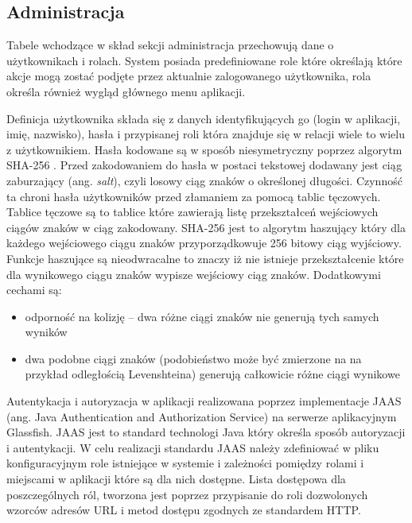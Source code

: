  
  
\subsection{Administracja}  


Tabele wchodzące w skład sekcji administracja przechowują dane o użytkownikach i rolach. System posiada predefiniowane role które określają które akcje mogą zostać podjęte przez aktualnie zalogowanego użytkownika, rola określa również wygląd głównego menu aplikacji.

Definicja użytkownika składa się z danych identyfikujących go (login w aplikacji, imię, nazwisko), hasła i przypisanej roli która znajduje się w relacji wiele to wielu z użytkownikiem. Hasła kodowane są w sposób niesymetryczny poprzez algorytm SHA-256 \cite{sha2}. Przed zakodowaniem do hasła w postaci tekstowej dodawany jest ciąg zaburzający (ang. \textit{salt}), czyli losowy ciąg znaków o określonej długości. Czynność ta chroni hasła użytkowników przed złamaniem za pomocą tablic tęczowych. Tablice tęczowe są to tablice które zawierają listę przekształceń wejściowych ciągów znaków w ciąg zakodowany. SHA-256 jest to algorytm haszujący \cite{hash} który dla każdego wejściowego ciągu znaków przyporządkowuje 256 bitowy ciąg wyjściowy. Funkcje haszujące są nieodwracalne to znaczy iż nie istnieje przekształcenie które dla wynikowego ciągu znaków wypisze wejściowy ciąg znaków. Dodatkowymi cechami są:
\begin{itemize}
  \item  odporność na kolizję --  dwa różne ciągi znaków nie generują tych samych wyników 
  \item dwa podobne ciągi znaków (podobieństwo może być zmierzone na na przykład odległością Levenshteina\cite{Levenshtein}) generują całkowicie różne ciągi wynikowe
\end{itemize}

Autentykacja i autoryzacja w aplikacji realizowana poprzez implementacje JAAS\cite{jaas} (ang. Java Authentication and Authorization Service) na serwerze aplikacyjnym Glassfish. JAAS jest to standard technologi Java który określa sposób autoryzacji i autentykacji. W celu realizacji standardu JAAS należy zdefiniować w pliku konfiguracyjnym role istniejące w systemie i zależności pomiędzy rolami i miejscami w aplikacji które są dla nich dostępne. Lista dostępowa dla poszczególnych ról, tworzona jest poprzez przypisanie do roli dozwolonych wzorców adresów URL i metod dostępu zgodnych ze standardem HTTP.

